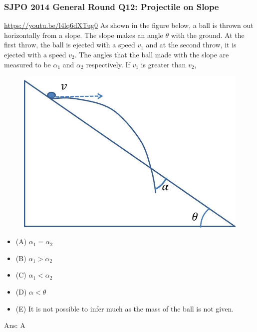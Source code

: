 \documentclass{article}
\begin{document}
\begin{samepage}
\subsubsection{SJPO 2014 General Round Q12: Projectile on Slope}
\url{https://youtu.be/l4lq6dXTug0}
As shown in the figure below, a ball is thrown out horizontally from a slope. The slope makes an angle $\theta$ with the ground. At the first throw, the ball is ejected with a speed $v_1$ and at the second throw, it is ejected with a speed $v_2$. The angles that the ball made with the slope are measured to be $\alpha_1$ and $\alpha_2$ respectively. If $v_1$ is greater than $v_2$,\\
 \begin{figure} 
\includegraphics[width=\linewidth]{images/2014q12.png}
\end{figure}
\begin{itemize}
\item[](A) $\alpha_1=\alpha_2$
\item[](B) $\alpha_1>\alpha_2$
\item[](C) $\alpha_1<\alpha_2$
\item[](D) $\alpha<\theta$
\item[](E) It is not possible to infer much as the mass of the ball is not given.
\end{itemize}
Ans: \ifpaper A \fi \\[10pt]
\end{samepage}
\end{document}

